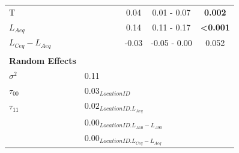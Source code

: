 \begin{table}[h!]
\begin{tabular}{@{}l|lccccc@{}}
    T                                        & \multicolumn{1}{c}{}                                    &               &                           & 0.04  & 0.01 - 0.07   & \textbf{0.002}            \\
    $L_{Aeq}$                                & \multicolumn{1}{c}{}                                    &               &                           & 0.14  & 0.11 - 0.17   & \textbf{\textless{}0.001} \\
    $L_{Ceq}-L_{Aeq}$                        & \multicolumn{1}{c}{}                                    &               &                           & -0.03 & -0.05 - 0.00  & 0.052                     \\
    \\
    \textbf{Random Effects}                  &
                                             &
    \multicolumn{1}{l}{}                     &
    \multicolumn{1}{l}{}                     &
    \multicolumn{1}{l}{}                     &
    \multicolumn{1}{l}{}                     &
    \multicolumn{1}{l}{}                                                                                                                                                                               \\
    $\sigma^2$                               &
    0.11                                     &
    \multicolumn{1}{l}{}                     &
    \multicolumn{1}{l}{}                     &
    \multicolumn{1}{l}{}                     &
    \multicolumn{1}{l}{}                     &
    \multicolumn{1}{l}{}                                                                                                                                                                               \\
    $\tau_{00}$                              & \multicolumn{6}{l}{$0.03_{LocationID}$}                                                                                                                 \\
    $\tau_{11}$                              & \multicolumn{6}{l}{$0.02_{LocationID.L_{Aeq}}$}                                                                                                         \\
                                             & \multicolumn{6}{l}{$0.00_{LocationID.L_{A10}-L_{A90}}$}                                                                                                 \\
                                             & \multicolumn{6}{l}{$0.00_{LocationID.L_{Ceq}-L_{Aeq}}$}                                                                                                 \\

\end{tabular}
\end{table}
